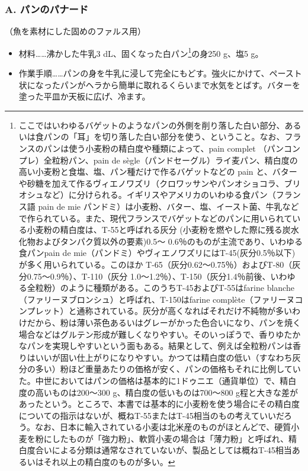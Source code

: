 \begin{recette}
\hypertarget{panade-a}{%
\subsubsection{A. パンのパナード}\label{panade-a}}



（魚を素材にした固めのファルス用）

\begin{itemize}
\item
  材料\ldots{}\ldots{}沸かした牛乳3 dL、固くなった白パン\footnote{ここではいわゆるバゲットのようなパンの外側を削り落した白い部分、あるいは食パンの「耳」を切り落した白い部分を使う、ということ。なお、フランスのパンは使う小麦粉の精白度や種類によって、pain
    complet （パンコンプレ）全粒粉パン、pain de
    sègle（パンドセーグル）ライ麦パン、精白度の高い小麦粉と食塩、塩、パン種だけで作るバゲットなどの
    pain
    と、バターや砂糖を加えて作るヴィエノワズリ（クロワッサンやパンオショコラ、ブリオシュなど）に分けられる。イギリスやアメリカのいわゆる食パン（フランス語
    pain de mie
    パンドミ）は小麦粉、バター、塩、イースト菌、牛乳などで作られている。また、現代フランスでバゲットなどのパンに用いられている小麦粉の精白度は、T-55と呼ばれる灰分
    (小麦粉を燃やした際に残る炭水化物およびタンパク質以外の要素)0.5〜
    0.6％のものが主流であり、いわゆる食パンpain de
    mie（パンドミ）やヴィエノワズリにはT-45(灰分0.5％以下)が多く用いられている。このほか
    T-65（灰分0.62〜0.75％）およびT-80（灰分0.75〜0.9％）、T-110（灰分
    1.0〜1.2％）、T-150（灰分1.4％前後、いわゆる全粒粉）のように種類がある。このうちT-45およびT-55はfarine
    blanche（ファリーヌブロンシュ）と呼ばれ、T-150はfarine
    complète（ファリーヌコンプレット）と通称されている。灰分が高くなればそれだけ不純物が多いわけだから、粉は薄い茶色あるいはグレーがかった色合いになり、パンを焼く場合などはグルテン形成が難しくなりやすい。そのいっぽうで、香りゆたかなパンを実現しやすいという面もある。結果として、例えば全粒粉パンは香りはいいが固い仕上がりになりやすい。かつては精白度の低い（すなわち灰分の多い）粉ほど重量あたりの価格が安く、パンの価格もそれに比例していた。中世においてはパンの価格は基本的に1ドゥニエ（通貨単位）で、精白度の高いものは200〜300
    g、精白度の低いものは700〜800
    g程と大きな差があったという。ところで、本書では基本的に小麦粉を使う場合にその精白度についての指示はないが、概ねT-55またはT-45相当のもの考えていいだろう。なお、日本に輸入されている小麦は北米産のものがほとんどで、硬質小麦を粉にしたものが「強力粉」、軟質小麦の場合は「薄力粉」と呼ばれ、精白度合いによる分類は通常なされていないが、製品としては概ねT-45相当あるいはそれ以上の精白度のものが多い。}の身250
  g、塩5 g。
\item
  作業手順\ldots{}\ldots{}パンの身を牛乳に浸して完全にもどす。強火にかけて、ペースト状になったパンがヘラから簡単に取れるくらいまで水気をとばす。バターを塗った平皿か天板に広げ、冷ます。
\end{itemize}


\end{recette}
